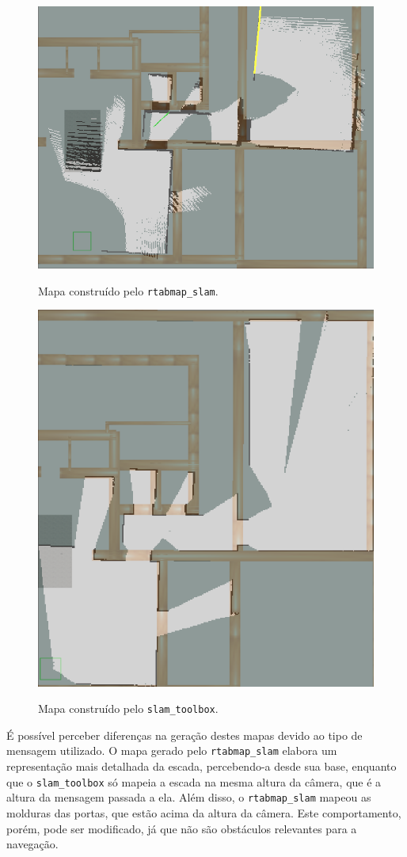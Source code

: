 \documentclass[repeatfields,xlists,xpacks,oneside,yearsonly]{ufrgscca}
\begin{document}
\begin{figure}[h]
    {
        \centering
        \caption{Mapa construído pelo \texttt{rtabmap\_slam}.}
        \label{fig:mapping_rtabmap}
        \includegraphics[width=0.8\linewidth]{rtabmap_slam_map-compared.png}\\
    }
\end{figure}

\begin{figure}[htbp]
    {
        \centering
        \caption{Mapa construído pelo \texttt{slam\_toolbox}.}
        \label{fig:mapping_slam_toolbox}
        \includegraphics[width=0.6\linewidth]{slam_toolbox_map-compared.png}\\
    }
\end{figure}

É possível perceber diferenças na geração destes mapas devido ao tipo de mensagem
utilizado. O mapa gerado pelo \texttt{rtabmap\_slam} elabora um representação mais
detalhada da escada, percebendo-a desde sua base, enquanto que o \texttt{slam\_toolbox}
só mapeia a escada na mesma altura da câmera, que é a altura da mensagem passada
a ela.
Além disso, o \texttt{rtabmap\_slam} mapeou as molduras das portas, que estão acima
da altura da câmera. Este comportamento, porém, pode ser modificado, já que
não são obstáculos relevantes para a navegação.
\end{document}
